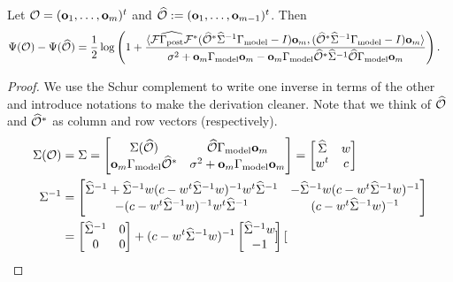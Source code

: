 \documentclass{amsart}
\numberwithin{equation}{section}
\begin{document}
\begin{lemma}\label{lemma:design increase}
  Let $\mathcal{O} = (\mathbf{o}_1,\dots,\mathbf{o}_m)^t$ and $\widehat{\mathcal{O}} := (\mathbf{o}_1,\dots,\mathbf{o}_{m-1})^t$. Then
  \begin{align*}
    \Psi( \mathcal{O} ) - \Psi (\widehat{\mathcal{O}} ) &=
    \frac12 \log \left ( 1 + \frac{
      \langle \mathcal{F} \widehat{\Gamma_{\textup{post}}} \mathcal{F}^* (\widehat{\mathcal{O}}^* \widehat{\Sigma}^{-1} \Gamma_{\textup{model}} - I ) \mathbf{o}_m,
      (\widehat{\mathcal{O}}^* \widehat{\Sigma}^{-1} \Gamma_{\textup{model}} - I ) \mathbf{o}_m \rangle
    }{
      \sigma^2 + \mathbf{o}_m \Gamma_{\textup{model}} \mathbf{o}_m - \mathbf{o}_m \Gamma_{\textup{model}} \widehat{\mathcal{O}}^* \widehat{\Sigma}^{-1} \widehat{\mathcal{O}} \Gamma_{\textup{model}} \mathbf{o}_m 
    }       
    \right ).
  \end{align*}
\end{lemma}
\begin{proof}
  We use the Schur complement to write one inverse in terms of the other and
  introduce notations to make the derivation cleaner. Note that we think of
  $\widehat{\mathcal{O}}$ and $\widehat{\mathcal{O}}^*$ as column and row vectors (respectively).
  \begin{align*}
    \Sigma( \mathcal{O} ) &= \Sigma = 
    \begin{bmatrix}
      \Sigma (\widehat{\mathcal{O}} )           & \widehat{\mathcal{O}} \Gamma_{\textup{model}} \mathbf{o}_m \\
      \mathbf{o}_m \Gamma_{\textup{model}} \widehat{\mathcal{O}}^*   & \sigma^2 + \mathbf{o}_m \Gamma_{\textup{model}} \mathbf{o}_m
    \end{bmatrix}
    =
    \begin{bmatrix}
      \widehat{\Sigma}   & w \\
      w^t       & c
    \end{bmatrix}\\
    \Sigma^{-1} &=
    \begin{bmatrix}
      \widehat{\Sigma}^{-1} + \widehat{\Sigma}^{-1} w ( c - w^t \widehat{\Sigma}^{-1} w)^{-1} w^t \widehat{\Sigma}^{-1} & - \widehat{\Sigma}^{-1} w ( c - w^t \widehat{\Sigma}^{-1} w)^{-1} \\
      -( c - w^t \widehat{\Sigma}^{-1} w)^{-1} w^t \widehat{\Sigma}^{-1}                            &  ( c - w^t \widehat{\Sigma}^{-1} w)^{-1}
    \end{bmatrix} \\
    &=
    \begin{bmatrix}
      \widehat{\Sigma}^{-1} & 0 \\
      0           & 0 
    \end{bmatrix}
    + (c -w^t \widehat{\Sigma}^{-1} w )^{-1}
    \begin{bmatrix}
      \widehat{\Sigma}^{-1} w \\
      -1
    \end{bmatrix}
    \begin{bmatrix}

\end{bmatrix}
\end{align*}
\end{proof}
\end{document}
